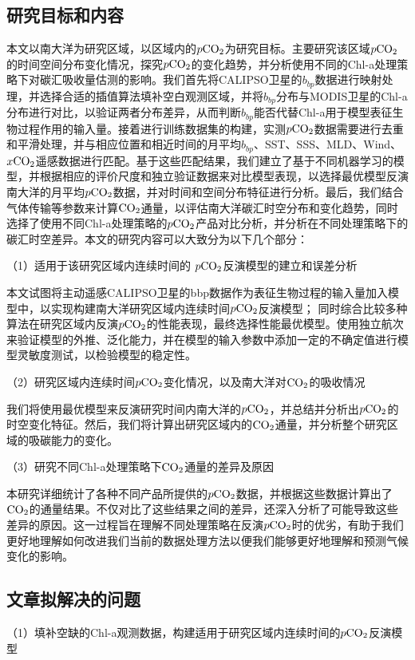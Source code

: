 \subsection{研究目标和内容}
本文以南大洋为研究区域，以区域内的$p\rm CO_2$为研究目标。主要研究该区域$p\rm CO_2$的时间空间分布变化情况，探究$p\rm CO_2$的变化趋势，并分析使用不同的Chl-a处理策略下对碳汇吸收量估测的影响。我们首先将CALIPSO卫星的$b_{bp}$数据进行映射处理，并选择合适的插值算法填补空白观测区域，并将$b_{bp}$分布与MODIS卫星的Chl-a分布进行对比，以验证两者分布差异，从而判断$b_{bp}$能否代替Chl-a用于模型表征生物过程作用的输入量。接着进行训练数据集的构建，实测$p\rm CO_2$数据需要进行去重和平滑处理，并与相应位置和相近时间的月平均$b_{bp}$、SST、SSS、MLD、Wind、$x\rm CO_2$遥感数据进行匹配。基于这些匹配结果，我们建立了基于不同机器学习的模型，并根据相应的评价尺度和独立验证数据来对比模型表现，以选择最优模型反演南大洋的月平均$p\rm CO_2$数据，并对时间和空间分布特征进行分析。最后，我们结合气体传输等参数来计算$\rm CO_2$通量，以评估南大洋碳汇时空分布和变化趋势，同时选择了使用不同Chl-a处理策略的$p\rm CO_2$产品对比分析，并分析在不同处理策略下的碳汇时空差异。本文的研究内容可以大致分为以下几个部分：

（1）适用于该研究区域内连续时间的 $p\rm CO_2$反演模型的建立和误差分析

本文试图将主动遥感CALIPSO卫星的bbp数据作为表征生物过程的输入量加入模型中，以实现构建南大洋研究区域内连续时间$p\rm CO_2$反演模型；
同时综合比较多种算法在研究区域内反演$p\rm CO_2$的性能表现，最终选择性能最优模型。使用独立航次来验证模型的外推、泛化能力，并在模型的输入参数中添加一定的不确定值进行模型灵敏度测试，以检验模型的稳定性。

（2）研究区域内连续时间$p\rm CO_2$变化情况，以及南大洋对$\rm CO_2$的吸收情况

我们将使用最优模型来反演研究时间内南大洋的$p\rm CO_2$，并总结并分析出$p\rm CO_2$的时空变化特征。然后，我们将计算出研究区域内的$\rm CO_2$通量，并分析整个研究区域的吸碳能力的变化。

（3）研究不同Chl-a处理策略下$\rm CO_2$通量的差异及原因

本研究详细统计了各种不同产品所提供的$p\rm CO_2$数据，并根据这些数据计算出了$\rm CO_2$的通量结果。不仅对比了这些结果之间的差异，还深入分析了可能导致这些差异的原因。这一过程旨在理解不同处理策略在反演$p\rm CO_2$时的优劣，有助于我们更好地理解如何改进我们当前的数据处理方法以便我们能够更好地理解和预测气候变化的影响。

\subsection{文章拟解决的问题}
（1）填补空缺的Chl-a观测数据，构建适用于研究区域内连续时间的$p\rm CO_2$反演模型

